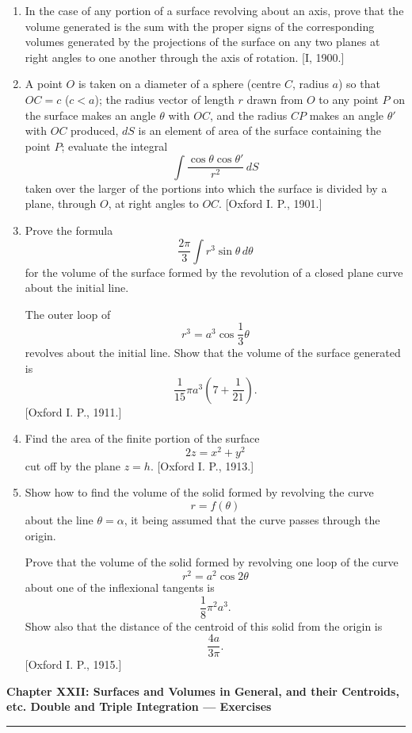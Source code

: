 \documentclass[11pt, a4paper]{article}
\newcommand{\source}[1]{\hfill\textnormal{[#1]}}
\begin{document}
\begin{enumerate}[leftmargin=2em]
\item[26.] In the case of any portion of a surface revolving about an axis, prove that the volume generated is the sum with the proper signs of the corresponding volumes generated by the projections of the surface on any two planes at right angles to one another through the axis of rotation.
\source{I, 1900.}

\item[27.] A point $O$ is taken on a diameter of a sphere (centre $C$, radius $a$) so that $OC=c$ ($c<a$); the radius vector of length $r$ drawn from $O$ to any point $P$ on the surface makes an angle $\theta$ with $OC$, and the radius $CP$ makes an angle $\theta'$ with $OC$ produced, $dS$ is an element of area of the surface containing the point $P$; evaluate the integral
\[
\int\frac{\cos\theta\cos\theta'}{r^2}\,dS
\]
taken over the larger of the portions into which the surface is divided by a plane, through $O$, at right angles to $OC$.
\source{Oxford I. P., 1901.}

\item[28.] Prove the formula
\[
\frac{2\pi}{3}\int r^3\sin\theta\,d\theta
\]
for the volume of the surface formed by the revolution of a closed plane curve about the initial line.

The outer loop of
\[
r^3=a^3\cos\frac{1}{3}\theta
\]
revolves about the initial line. Show that the volume of the surface generated is
\[
\frac{1}{15}\pi a^3\left(7+\frac{1}{21}\right).
\]
\source{Oxford I. P., 1911.}

\item[29.] Find the area of the finite portion of the surface
\[
2z=x^2+y^2
\]
cut off by the plane $z=h$.
\source{Oxford I. P., 1913.}

\item[30.] Show how to find the volume of the solid formed by revolving the curve
\[
r=f(\theta)
\]
about the line $\theta=\alpha$, it being assumed that the curve passes through the origin.

Prove that the volume of the solid formed by revolving one loop of the curve
\[
r^2=a^2\cos 2\theta
\]
about one of the inflexional tangents is
\[
\frac{1}{8}\pi^2a^3.
\]
Show also that the distance of the centroid of this solid from the origin is
\[
\frac{4a}{3\pi}.
\]
\source{Oxford I. P., 1915.}

\end{enumerate}

\newpage

\begin{center}
    {\LARGE \bfseries \color{accent} Chapter XXII: Surfaces and Volumes in General, and their Centroids, etc. Double and Triple Integration --- Exercises}\\
    \vspace{0.2cm}
    {\color{accent}\rule{0.55\linewidth}{0.8pt}}
\end{center}
\vspace{0.35cm}
\end{document}
